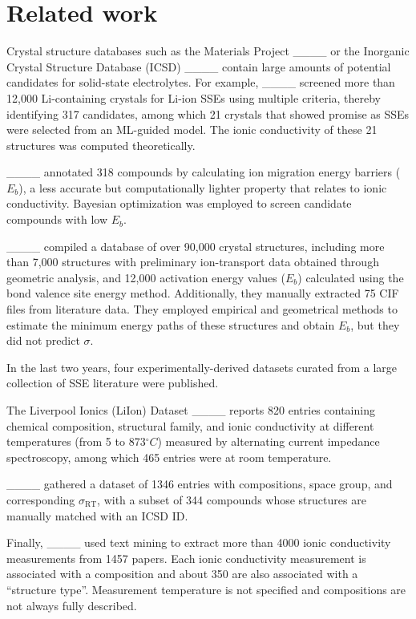 \section{Related work}
\label{sec:relatedwork}

Crystal structure databases such as the Materials Project ____ or the Inorganic Crystal Structure Database (ICSD) ____ contain large amounts of potential candidates for solid-state electrolytes. For example, ____ screened more than 12,000 Li-containing crystals for Li-ion SSEs using multiple criteria, thereby identifying 317 candidates, among which 21 crystals that showed promise as SSEs were selected from an ML-guided model. The ionic conductivity of these 21 structures was computed theoretically.

____ annotated 318 compounds by calculating ion migration energy barriers ($E_b$), a less accurate but computationally lighter property that relates to ionic conductivity. Bayesian optimization was employed to screen candidate compounds with low $E_b$.

____ compiled a database of over 90,000 crystal structures, including more than 7,000 structures with preliminary ion-transport data obtained through geometric analysis, and 12,000 activation energy values ($E_b$) calculated using the bond valence site energy method. Additionally, they manually extracted 75 CIF files from literature data. They employed empirical and geometrical methods to estimate the minimum energy paths of these structures and obtain $E_b$, but they did not predict $\sigma$.

In the last two years, four experimentally-derived datasets curated from a large collection of SSE literature were published. 

The Liverpool Ionics (LiIon) Dataset ____ reports 820 entries containing chemical composition, structural family, and ionic conductivity at different temperatures (from 5 to 873$^\circ C$) measured by alternating current impedance spectroscopy, among which 465 entries were at room temperature.

____ gathered a dataset of 1346 entries with compositions, space group, and corresponding $\sigma_{\text{RT}}$, with a subset of 344 compounds whose structures are manually matched with an ICSD ID. 

Finally, ____ used text mining to extract more than 4000 ionic conductivity measurements from 1457 papers. Each ionic conductivity measurement is associated with a composition and about 350 are also associated with a ``structure type''. Measurement temperature is not specified and compositions are not always fully described.

